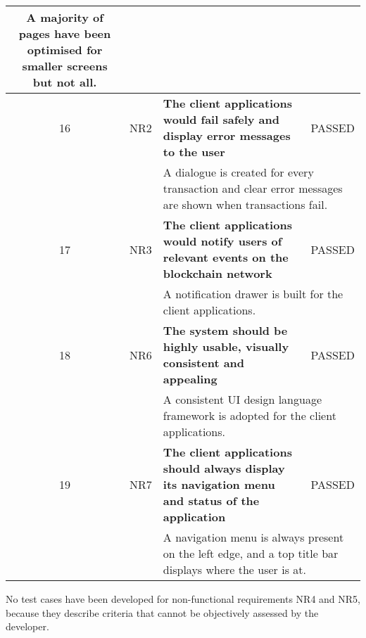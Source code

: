 \begin{table}[!ht]
\begin{tabularx}{\textwidth}{|c|c|X|c|}
{           A majority of pages have been optimised for smaller screens but not all.}      \\
        \hline
        16 & NR2 & \textbf{The client applications would fail safely and display error messages
		to the user} & \cellcolor{green}PASSED \\
		\hline
           &      & \multicolumn{2}{X|}{A dialogue is created for every transaction 
           and clear error messages are shown when transactions fail.}      \\
        \hline
        17 & NR3 & \textbf{The client applications would notify users of relevant
        events on the blockchain network} & \cellcolor{green}PASSED \\
		\hline
           &      & \multicolumn{2}{X|}{A notification drawer is built for the client applications.}      \\
        \hline
        18 & NR6 & \textbf{The system should be highly usable, visually consistent and appealing} & \cellcolor{green}PASSED \\
		\hline
           &      & \multicolumn{2}{X|}{A consistent UI design language framework is adopted for the client applications.}      \\
        \hline
        19 & NR7 & \textbf{The client applications should always display its navigation menu and status of the application} & \cellcolor{green}PASSED \\
		\hline
           &      & \multicolumn{2}{X|}{A navigation menu is always present on the left edge, and a top title bar displays where the user is at.}      \\
        \hline
	\end{tabularx}
\end{table}

No test cases have been developed for non-functional requirements NR4 and NR5, 
because they describe criteria that cannot be objectively assessed by the developer.